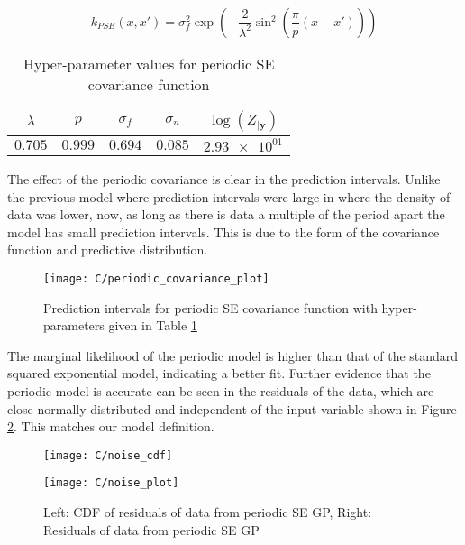 \documentclass[11pt]{article}
\begin{document}
\[k_{PSE}(x,x') = \sigma_f^2 \exp(-\frac{2}{\lambda^2}\sin^2(\frac{\pi}{p}(x-x')))\]

\begin{table}[h]
    \centering
    \small
    \begin{tabular}{|c|c|c|c|c|}
        \hline
        $\lambda$ & $p$ & $\sigma_f$ & $\sigma_n$ & $\log(Z_{|\textbf{y}})$ \\
        \hline
        $0.705$ & $0.999$ & $0.694$ & $0.085$ & $\num{2.93e+01}$ \\ 
        \hline
    \end{tabular}
    \caption{Hyper-parameter values for periodic SE covariance function}
    \label{table:C_periodic_covariance_hyper_parameters}
\end{table}

The effect of the periodic covariance is clear in the prediction intervals. Unlike the previous model where prediction intervals were large in where the density of data was lower, now, as long as there is data a multiple of the period apart the model has small prediction intervals. This is due to the form of the covariance function and predictive distribution.

\begin{figure}[h]
    \centering
    \texttt{[image: C/periodic\_covariance\_plot]}
    \caption{Prediction intervals for periodic SE covariance function with hyper-parameters given in Table \ref{table:C_periodic_covariance_hyper_parameters}}
    \label{fig:C_periodic_covariance_prediction_intervals}
\end{figure}

The marginal likelihood of the periodic model is higher than that of the standard squared exponential model, indicating a better fit. Further evidence that the periodic model is accurate can be seen in the residuals of the data, which are close normally distributed and independent of the input variable shown in Figure \ref{fig:C_noise_distribution}. This matches our model definition.

\begin{figure}[h]
    \centering
    \begin{minipage}{0.5\textwidth}
        \centering
        \texttt{[image: C/noise\_cdf]}
    \end{minipage}%
    \begin{minipage}{0.5\textwidth}
        \centering
        \texttt{[image: C/noise\_plot]}
    \end{minipage}
    \caption{Left: CDF of residuals of data from periodic SE GP, Right: Residuals of data from periodic SE GP}
    \label{fig:C_noise_distribution}
\end{figure}
\end{document}
